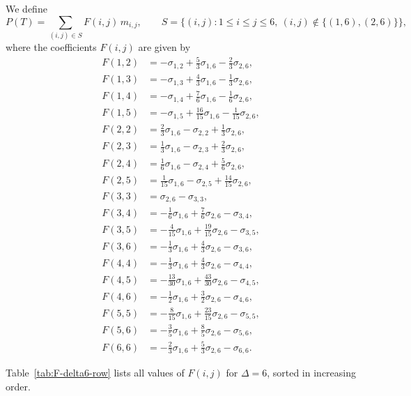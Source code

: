 \documentclass[preprint,12pt]{elsarticle}
\begin{document}
\medskip
We define
\[
P(T)=\sum_{(i,j)\in S} F(i,j)\,m_{i,j},
\qquad
S=\{(i,j):1\le i\le j\le 6,\ (i,j)\notin\{(1,6),(2,6)\}\},
\]
where the coefficients $F(i,j)$ are given by
\[
\begin{aligned}
F(1,2) &= -\sigma_{1,2} + \tfrac{5}{3}\sigma_{1,6} - \tfrac{2}{3}\sigma_{2,6},\\
F(1,3) &= -\sigma_{1,3} + \tfrac{4}{3}\sigma_{1,6} - \tfrac{1}{3}\sigma_{2,6},\\
F(1,4) &= -\sigma_{1,4} + \tfrac{7}{6}\sigma_{1,6} - \tfrac{1}{6}\sigma_{2,6},\\
F(1,5) &= -\sigma_{1,5} + \tfrac{16}{15}\sigma_{1,6} - \tfrac{1}{15}\sigma_{2,6},\\[2mm]
F(2,2) &= \tfrac{2}{3}\sigma_{1,6} - \sigma_{2,2} + \tfrac{1}{3}\sigma_{2,6},\\
F(2,3) &= \tfrac{1}{3}\sigma_{1,6} - \sigma_{2,3} + \tfrac{2}{3}\sigma_{2,6},\\
F(2,4) &= \tfrac{1}{6}\sigma_{1,6} - \sigma_{2,4} + \tfrac{5}{6}\sigma_{2,6},\\
F(2,5) &= \tfrac{1}{15}\sigma_{1,6} - \sigma_{2,5} + \tfrac{14}{15}\sigma_{2,6},\\[2mm]
F(3,3) &= \sigma_{2,6} - \sigma_{3,3},\\
F(3,4) &= -\tfrac{1}{6}\sigma_{1,6} + \tfrac{7}{6}\sigma_{2,6} - \sigma_{3,4},\\
F(3,5) &= -\tfrac{4}{15}\sigma_{1,6} + \tfrac{19}{15}\sigma_{2,6} - \sigma_{3,5},\\
F(3,6) &= -\tfrac{1}{3}\sigma_{1,6} + \tfrac{4}{3}\sigma_{2,6} - \sigma_{3,6},\\[2mm]
F(4,4) &= -\tfrac{1}{3}\sigma_{1,6} + \tfrac{4}{3}\sigma_{2,6} - \sigma_{4,4},\\
F(4,5) &= -\tfrac{13}{30}\sigma_{1,6} + \tfrac{43}{30}\sigma_{2,6} - \sigma_{4,5},\\
F(4,6) &= -\tfrac{1}{2}\sigma_{1,6} + \tfrac{3}{2}\sigma_{2,6} - \sigma_{4,6},\\[2mm]
F(5,5) &= -\tfrac{8}{15}\sigma_{1,6} + \tfrac{23}{15}\sigma_{2,6} - \sigma_{5,5},\\
F(5,6) &= -\tfrac{3}{5}\sigma_{1,6} + \tfrac{8}{5}\sigma_{2,6} - \sigma_{5,6},\\
F(6,6) &= -\tfrac{2}{3}\sigma_{1,6} + \tfrac{5}{3}\sigma_{2,6} - \sigma_{6,6}.
\end{aligned}
\]

Table~\ref{tab:F-delta6-row} lists all values of $F(i,j)$ for $\Delta=6$, sorted
in increasing order.
\end{document}
